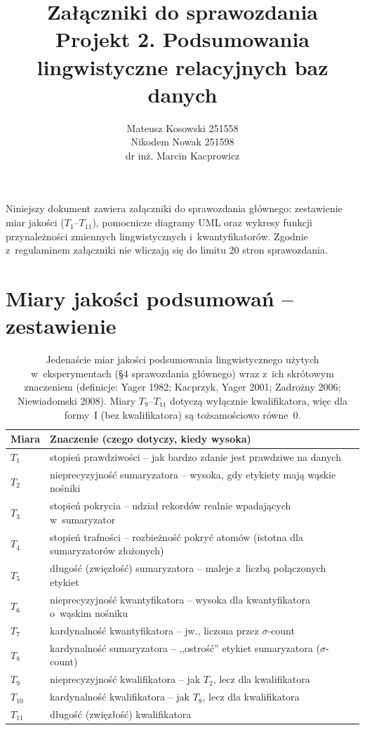 \documentclass{article}
\author{
    Mateusz Kosowski 251558 \\
    Nikodem Nowak 251598 \\
dr inż. Marcin Kacprowicz
}
\title{Załączniki do sprawozdania\\Projekt 2. Podsumowania lingwistyczne relacyjnych baz danych}
\begin{document}
\maketitle

\noindent Niniejszy dokument zawiera załączniki do sprawozdania głównego:
zestawienie miar jakości ($T_1$--$T_{11}$), pomocnicze diagramy UML oraz
wykresy funkcji przynależności zmiennych lingwistycznych i~kwantyfikatorów.
Zgodnie z~regulaminem załączniki nie wliczają się do limitu 20 stron
sprawozdania.

\appendix
\section{Miary jakości podsumowań -- zestawienie}
\label{app:measures}

\begin{table}[H]
\centering
\caption{Jedenaście miar jakości podsumowania lingwistycznego użytych
w~eksperymentach (\S4 sprawozdania głównego) wraz z~ich skrótowym znaczeniem
(definicje: Yager 1982; Kacprzyk, Yager 2001; Zadrożny 2006; Niewiadomski 2008).
Miary $T_9$--$T_{11}$ dotyczą wyłącznie kwalifikatora, więc dla formy~I
(bez kwalifikatora) są tożsamościowo równe~$0$.}
\label{tab:measures}
\begin{tabular}{l p{}}
\toprule
Miara & Znaczenie (czego dotyczy, kiedy wysoka) \\
\midrule
$T_1$ & stopień prawdziwości -- jak bardzo zdanie jest prawdziwe na danych \\
$T_2$ & nieprecyzyjność sumaryzatora -- wysoka, gdy etykiety mają wąskie nośniki \\
$T_3$ & stopień pokrycia -- udział rekordów realnie wpadających w~sumaryzator \\
$T_4$ & stopień trafności -- rozbieżność pokryć atomów (istotna dla sumaryzatorów złożonych) \\
$T_5$ & długość (zwięzłość) sumaryzatora -- maleje z~liczbą połączonych etykiet \\
$T_6$ & nieprecyzyjność kwantyfikatora -- wysoka dla kwantyfikatora o~wąskim nośniku \\
$T_7$ & kardynalność kwantyfikatora -- jw., liczona przez $\sigma$-count \\
$T_8$ & kardynalność sumaryzatora -- ,,ostrość'' etykiet sumaryzatora ($\sigma$-count) \\
$T_9$ & nieprecyzyjność kwalifikatora -- jak $T_2$, lecz dla kwalifikatora \\
$T_{10}$ & kardynalność kwalifikatora -- jak $T_8$, lecz dla kwalifikatora \\
$T_{11}$ & długość (zwięzłość) kwalifikatora \\
\bottomrule
\end{tabular}
\end{table}
\end{document}
